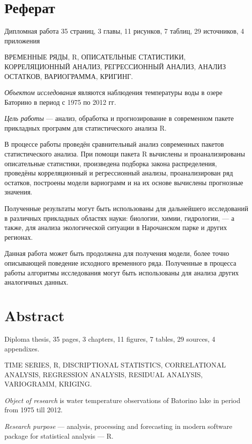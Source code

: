 
\newpage

\chapter*{Реферат}
Дипломная работа 35 страниц, 3 главы, 11 рисунков, 7 таблиц, 29 источников, 4 приложения

ВРЕМЕННЫЕ РЯДЫ, R, ОПИСАТЕЛЬНЫЕ СТАТИСТИКИ, КОРРЕЛЯЦИОННЫЙ АНАЛИЗ, РЕГРЕССИОННЫЙ АНАЛИЗ, АНАЛИЗ ОСТАТКОВ, ВАРИОГРАММА, КРИГИНГ.

\textit{Объектом исследования} являются наблюдения температуры воды в озере Баторино в период с 1975 по 2012 гг.

\textit{Цель работы} --- анализ, обработка и прогнозирование в современном пакете прикладных программ для статистического анализа R.

В процессе работы проведён сравнительный анализ современных пакетов статистического анализа. При помощи пакета R вычислены и проанализированы описательные статистики, произведена подборка закона распределения, проведёны корреляционный и регрессионный анализы, проанализирован ряд остатков, построены модели вариограмм и на их основе вычислены прогнозные значения.

Полученные результаты могут быть использованы для дальнейшего исследований в различных прикладных областях науки: биологии, химии, гидрологии, --- а также, для анализа экологической ситуации в Нарочанском парке и других регионах.

Данная работа может быть продолжена для получения модели, более точно описывающей поведение исходного временного ряда. Полученные в процесса работы алгоритмы исследования могут быть использованы для анализа других аналогичных данных.

\newpage

\chapter*{Abstract}
Diploma thesis, 35 pages, 3 chapters, 11 figures, 7 tables, 29 sources, 4 appendixes.

TIME SERIES, R, DISCRIPTIONAL STATISTICS, CORRELATIONAL ANALYSIS, REGRESSION ANALYSIS, RESIDUAL ANALYSIS, VARIOGRAMM, KRIGING.

\textit{Object of research} is water temperature observations of Batorino lake in period from 1975 till 2012.

\textit{Research purpose} --- analysis, processing and forecasting in modern software package for statistical analysis --- R.

